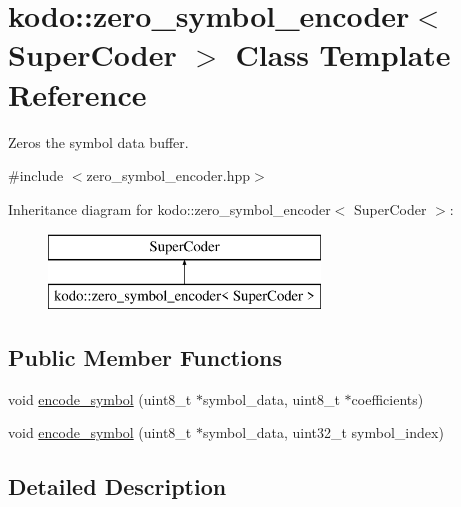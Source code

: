\hypertarget{classkodo_1_1zero__symbol__encoder}{\section{kodo\-:\-:zero\-\_\-symbol\-\_\-encoder$<$ Super\-Coder $>$ Class Template Reference}
\label{classkodo_1_1zero__symbol__encoder}
}


Zeros the symbol data buffer.  




{\ttfamily \#include $<$zero\-\_\-symbol\-\_\-encoder.\-hpp$>$}

Inheritance diagram for kodo\-:\-:zero\-\_\-symbol\-\_\-encoder$<$ Super\-Coder $>$\-:\begin{figure}[H]
\begin{center}
\leavevmode
\includegraphics[height=2.000000cm]{classkodo_1_1zero__symbol__encoder}
\end{center}
\end{figure}
\subsection*{Public Member Functions}
\begin{DoxyCompactItemize}
\item 
void \hyperlink{classkodo_1_1zero__symbol__encoder_a422126f1814d338bb3eeed9eba9ab80b}{encode\-\_\-symbol} (uint8\-\_\-t $\ast$symbol\-\_\-data, uint8\-\_\-t $\ast$coefficients)
\begin{DoxyCompactList}\small\item\em \end{DoxyCompactList}\item 
void \hyperlink{classkodo_1_1zero__symbol__encoder_a098acb6272ff09e5fdbb3ce10aabd807}{encode\-\_\-symbol} (uint8\-\_\-t $\ast$symbol\-\_\-data, uint32\-\_\-t symbol\-\_\-index)
\begin{DoxyCompactList}\small\item\em \end{DoxyCompactList}\end{DoxyCompactItemize}


\subsection{Detailed Description}
